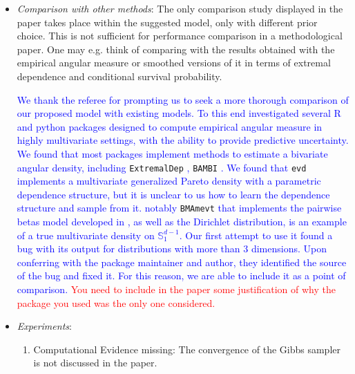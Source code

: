\documentclass[10pt]{article}
\newcommand{\bruno}[1]{\textcolor{red}{#1}}
\newcommand{\response}[1]{\textcolor{blue}{#1}}
\begin{document}
\begin{itemize}
\item \emph{Comparison with other methods}: The only comparison study displayed in the paper 
    takes place within the suggested model, only with different prior choice. This is not sufficient 
    for performance comparison in a methodological paper. One may e.g. think of comparing with the
    results obtained with the empirical angular measure or smoothed versions of it in terms of 
    extremal dependence and conditional survival probability.

\response{We thank the referee for prompting us to seek a more thorough comparison of our proposed
        model with existing models. To this end investigated several R and python packages designed 
        to compute empirical angular measure in highly multivariate settings, with the ability to 
        provide predictive uncertainty. We found that most packages implement methods to estimate
        a bivariate angular density,}  \response{including} \verb|ExtremalDep| \response{\citep{ExtremalDep},}
        \verb|BAMBI| \response{\citep{BAMBI}. We found that} \verb|evd| \response{\citep{evd} implements a multivariate 
        generalized Pareto density with a  parametric dependence structure, but it is unclear to us 
        how to learn the dependence structure and sample from it. 
        notably} \verb|BMAmevt| \response{\citep{BMAmevt} that implements the 
        pairwise betas model developed in \cite{sabourin2013}, as well as the Dirichlet distribution,
        is an example of a true multivariate density on $\mathbb{S}_1^{d-1}$.  Our first attempt to use
        it found a bug with its output for distributions with more than 3 dimensions.  Upon 
        conferring with the package maintainer and author, they identified the source of the
        bug and fixed it.  For this reason, we are able to include it as a point of comparison.
}    
    \bruno{You need to include in the paper some justification of why the package you used was the only
    one considered.}

    \item \emph{Experiments}:
        \begin{enumerate}
            \item Computational Evidence missing: The convergence of the Gibbs sampler is not 
            discussed in the paper.


\end{enumerate}
\end{itemize}
\end{document}

